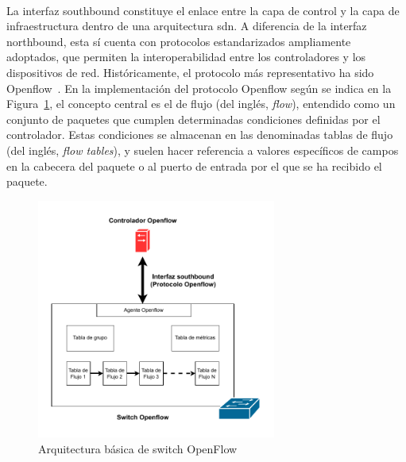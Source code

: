 \\
La interfaz southbound constituye el enlace entre la capa de control y la capa de infraestructura dentro de una arquitectura \gls{sdn}. A diferencia de la interfaz northbound, esta sí cuenta con protocolos estandarizados ampliamente adoptados, que permiten la interoperabilidad entre los controladores y los dispositivos de red. Históricamente, el protocolo más representativo ha sido Openflow~\cite{mckeown2008openflow}. En la implementación del protocolo Openflow según se indica en la Figura~\ref{fig:sdn_openflow}, el concepto central es el de flujo (del inglés, \textit{flow}), entendido como un conjunto de paquetes que cumplen determinadas condiciones definidas por el controlador. Estas condiciones se almacenan en las denominadas tablas de flujo (del inglés, \textit{flow tables}), y suelen hacer referencia a valores específicos de campos en la cabecera del paquete o al puerto de entrada por el que se ha recibido el paquete.

\begin{figure}[ht!]
\centering
\includegraphics[width=0.7\textwidth]{fig/02_sota/sota_3_sdn_openflow.drawio.pdf}
\caption{Arquitectura básica de switch OpenFlow}
\label{fig:sdn_openflow}
\end{figure}


